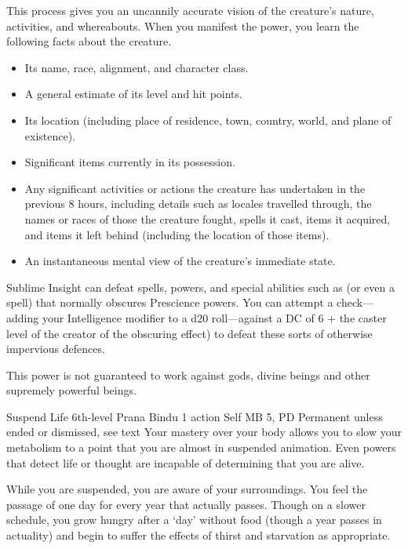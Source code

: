  This process gives you an uncannily accurate vision
  of the creature's nature,
  activities,
  and whereabouts.
  When you manifest the power,
  you learn the following facts about the creature.
  \begin{itemize}
    \item Its name, race, alignment, and character class.
    \item A general estimate of its level and hit points.
    \item Its location (including place of residence, town,
          country, world, and plane of existence).
    \item Significant items currently in its possession.
    \item Any significant activities or actions the creature
          has undertaken in the previous 8 hours,
          including details such as locales travelled through,
          the names or races of those the creature fought,
          spells it cast,
          items it acquired,
          and items it left behind
          (including the location of those items).
    \item An instantaneous mental view of the creature's
          immediate state.
  \end{itemize}

  Sublime Insight can defeat spells,
  powers,
  and special abilities such as 
  (or even a  spell)
  that normally obscures Prescience powers.
  You can attempt a check---adding your
  Intelligence modifier to a d20 roll---against
  a DC of 6 + the caster level of the
  creator of the obscuring effect)
  to defeat these sorts of otherwise impervious defences.

  This power is not guaranteed to work against gods, divine beings
  and other supremely powerful beings.

\DndPowerHeader%
  {Suspend Life}
  {6th-level Prana Bindu}
  {1 action}
  {Self}
  {MB 5, PD \lvlsix}
  {Permanent unless ended or dismissed, see text}
  Your mastery over your body allows you to slow your
  metabolism to a point
  that you are almost in suspended animation.
  Even powers that detect life or thought are
  incapable of determining that you are alive.

  While you are suspended,
  you are aware of your surroundings.
  You feel the passage of one day
  for every year that actually passes.
  Though on a slower schedule,
  you grow hungry after a `day' without food
  (though a year passes in actuality)
  and begin to suffer the effects of
  thirst and starvation as appropriate.
  
